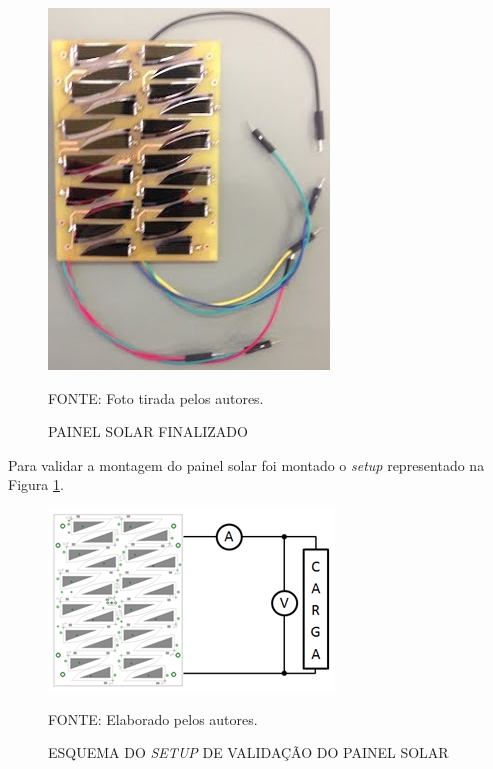 \documentclass[
	12pt,				%
	openright,			%
	oneside,			%
	a4paper,			%
	english,			%
	french,				%
	spanish,			%
	brazil,				%
	oldfontcommands
	]{abntex2}
\begin{document}
	\begin{figure}[th]
		\caption{PAINEL SOLAR FINALIZADO}
		\centering
		\includegraphics[width=0.75\linewidth]{./figs/painel_solar}
		
		\begin{small}
			FONTE: Foto tirada pelos autores.
		\end{small}	
	\end{figure}
	
	Para validar a montagem do painel solar foi montado o \textit{setup} representado na Figura \ref{Fig_setup_cell}.
	
	\begin{figure}[th]
		\caption{ESQUEMA DO \textit{SETUP} DE VALIDAÇÃO DO PAINEL SOLAR}
		\centering
		\label{Fig_setup_cell}
		\includegraphics[width=0.8\linewidth]{./figs/setup_solar}
		
		\begin{small}
			FONTE: Elaborado pelos autores.
		\end{small}	
	\end{figure}
	\pagebreak
	
\end{document}
